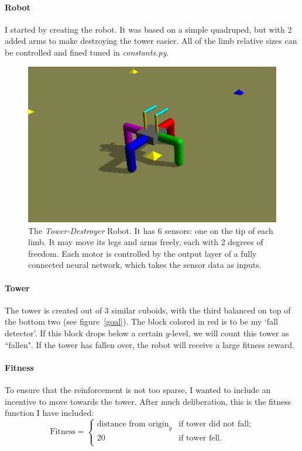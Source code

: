 \documentclass[12pt, a4paper]{article}
\begin{document}
\paragraph{Robot}
I started by creating the robot. It was based on a simple quadruped, but with 2 added arms to make destroying the tower easier. All of the limb relative sizes can be controlled and fined tuned in \emph{constants.py}.\par
\begin{figure}[h]
	\centering
	\includegraphics{robot.png}
	\caption{The \emph{Tower-Destroyer} Robot. It has 6 sensors: one on the tip of each limb. It may move its legs and arms freely, each with 2 degrees of freedom. Each motor is controlled by the output layer of a fully connected neural network, which takes the sensor data as inputs. }
\end{figure}
\paragraph{Tower}
The tower is created out of 3 similar cuboids, with the third balanced on top of the bottom two (see figure~\ref{goal}). The block colored in red is to be my `fall detector'. If this block drops below a certain $y$-level, we will count this tower as ``fallen". If the tower has fallen over, the robot will receive a large fitness reward.
\paragraph{Fitness} To ensure that the reinforcement is not too sparse, I wanted to include an incentive to move towards the tower. After much deliberation, this is the fitness function I have included:
$$
\text{Fitness} = \begin{cases}
\text{distance from origin}_y & \text{if tower did not fall};\\
20 & \text{if tower fell.}\\
\end{cases}
$$
\end{document}
